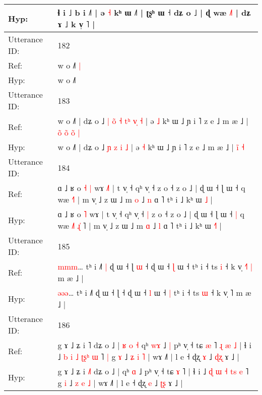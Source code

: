 \documentclass[10pt]{article}
\DeclareRobustCommand{\hl}[1]{{\textcolor{red}{#1}}}
\begin{document}
\begin{longtable}{ll}
 \\
Hyp: & ɬ i ˩ b i ˩˥ | ə \hl{˧} kʰ ɯ ˩˥ | ʈʂʰ ɯ ˧ dʑ o ˩ | ɖ wæ \hl{˩}˥ | dʑ ɤ ˩ k v̩ \hl{}˥ |
 \\
\midrule
Utterance ID: & 182 \\
Ref: & w o ˩˥\hl{ }\hl{|}
 \\
Hyp: & w o ˩˥\hl{}\hl{}
 \\
\midrule
Utterance ID: & 183 \\
Ref: & w o ˩˥ | dʑ o ˩\hl{ }\hl{|}\hl{ }\hl{o}\hl{̃} \hl{˧} \hl{t}\hl{ʰ} \hl{v}\hl{̩} \hl{˧} | ə \hl{˩} kʰ ɯ ˩ ɲ i ˥ z e ˩ m æ ˩ |\hl{ }\hl{o}\hl{̃}\hl{ }\hl{o}\hl{̃} \hl{o}̃ \hl{|}
 \\
Hyp: & w o ˩˥ | dʑ o ˩\hl{}\hl{}\hl{}\hl{}\hl{} \hl{ɲ} \hl{}\hl{z} \hl{}\hl{i} \hl{˩} | ə \hl{˧} kʰ ɯ ˩ ɲ i ˥ z e ˩ m æ ˩ |\hl{}\hl{}\hl{}\hl{}\hl{}\hl{} \hl{i}̃ \hl{˧}
 \\
\midrule
Utterance ID: & 184 \\
Ref: & ɑ ˩ ʁ o\hl{ }\hl{˧} \hl{|} wɤ\hl{ }\hl{˩}\hl{˥} | t v̩ ˧ qʰ v̩ ˧\hl{}\hl{} z o ˧ z o ˩ | ɖ ɯ ˧ ɭ ɯ ˧\hl{}\hl{} q wæ\hl{}\hl{}\hl{} \hl{}\hl{}\hl{˧}˥ | m v̩ ˩ z ɯ ˩ m \hl{o} ˩ \hl{n} ɑ ˥ tʰ i ˩ kʰ ɯ \hl{}\hl{˩} |
 \\
Hyp: & ɑ ˩ ʁ o\hl{}\hl{} \hl{˥} wɤ\hl{}\hl{}\hl{} | t v̩ ˧ qʰ v̩ ˧\hl{ }\hl{|} z o ˧ z o ˩ | ɖ ɯ ˧ ɭ ɯ ˧\hl{ }\hl{|} q wæ\hl{ }\hl{˩}\hl{˥} \hl{ɻ}\hl{̍}\hl{ }˥ | m v̩ ˩ z ɯ ˩ m \hl{ɑ} ˩ \hl{l} ɑ ˥ tʰ i ˩ kʰ ɯ \hl{˧}\hl{˥} |
 \\
\midrule
Utterance ID: & 185 \\
Ref: & \hl{m}\hl{m}\hl{m}… tʰ i ˩˥\hl{ }\hl{|} ɖ ɯ ˧ ɭ\hl{ }\hl{ɯ} ˧ ɖ ɯ ˧ \hl{ɭ} ɯ ˧\hl{}\hl{} tʰ i ˧ ts \hl{i} ˧ k v̩ \hl{˧}˥\hl{ }\hl{|} m æ ˩ |
 \\
Hyp: & \hl{ə}\hl{ə}\hl{ə}… tʰ i ˩˥\hl{}\hl{} ɖ ɯ ˧ ɭ\hl{}\hl{} ˧ ɖ ɯ ˧ \hl{l} ɯ ˧\hl{ }\hl{|} tʰ i ˧ ts \hl{ɯ} ˧ k v̩ \hl{}˥\hl{}\hl{} m æ ˩ |
 \\
\midrule
Utterance ID: & 186 \\
Ref: & g ɤ ˩ ʑ i \hl{}˥ dʑ o ˩ |\hl{ }\hl{ʁ}\hl{ }\hl{o}\hl{ }\hl{˧} qʰ \hl{w}\hl{ɤ} ˩\hl{ }\hl{|} pʰ v̩ ˧ tɕ \hl{æ} ˥\hl{ }\hl{ɻ}\hl{ }\hl{æ}\hl{ }\hl{˩} | ɬ i ˩ \hl{b} \hl{i} \hl{˩} \hl{ʈ}\hl{ʂ}\hl{ʰ} \hl{ɯ} ˥\hl{ }\hl{|} g \hl{ɤ} ˩ \hl{ʑ} \hl{i} \hl{˥} | wɤ ˩˥ | l e ˧ ɖʐ \hl{ɤ} ˩ \hl{ɖ}\hl{ʐ} ɤ ˩ |
 \\
Hyp: & g ɤ ˩ ʑ i \hl{˩}˥ dʑ o ˩ |\hl{}\hl{}\hl{}\hl{}\hl{}\hl{} qʰ \hl{}\hl{ɑ} ˩\hl{}\hl{} pʰ v̩ ˧ tɕ \hl{ɤ} ˥\hl{}\hl{}\hl{}\hl{}\hl{}\hl{} | ɬ i ˩ \hl{ɖ} \hl{ɯ} \hl{˧} \hl{}\hl{t}\hl{s} \hl{e} ˥\hl{}\hl{} g \hl{i} ˩ \hl{z} \hl{e} \hl{˩} | wɤ ˩˥ | l e ˧ ɖʐ \hl{e} ˩ \hl{ʈ}\hl{ʂ} ɤ ˩ |

\end{longtable}
\end{document}
